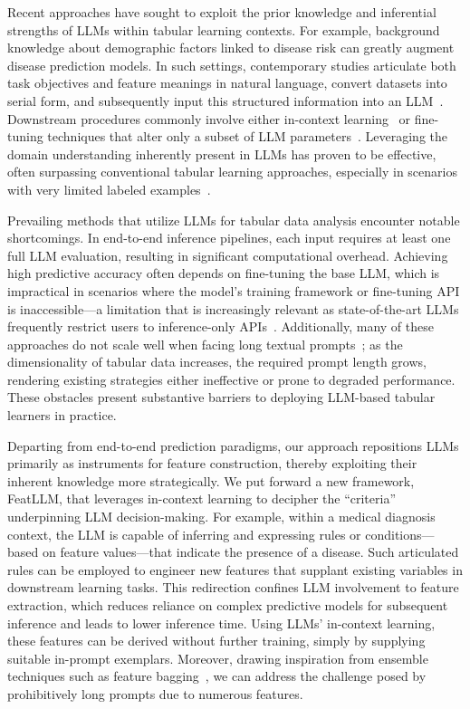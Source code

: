 Recent approaches have sought to exploit the prior knowledge and inferential strengths of LLMs within tabular learning contexts. For example, background knowledge about demographic factors linked to disease risk can greatly augment disease prediction models. In such settings, contemporary studies articulate both task objectives and feature meanings in natural language, convert datasets into serial form, and subsequently input this structured information into an LLM~\cite{dinh2022lift,wang2023anypredict}. Downstream procedures commonly involve either in-context learning~\cite{nam2023semi} or fine-tuning techniques that alter only a subset of LLM parameters~\cite{dinh2022lift,hegselmann2023tabllm}. Leveraging the domain understanding inherently present in LLMs has proven to be effective, often surpassing conventional tabular learning approaches, especially in scenarios with very limited labeled examples~\cite{hegselmann2023tabllm}.

Prevailing methods that utilize LLMs for tabular data analysis encounter notable shortcomings. In end-to-end inference pipelines, each input requires at least one full LLM evaluation, resulting in significant computational overhead. Achieving high predictive accuracy often depends on fine-tuning the base LLM, which is impractical in scenarios where the model's training framework or fine-tuning API is inaccessible—a limitation that is increasingly relevant as state-of-the-art LLMs frequently restrict users to inference-only APIs~\cite{anil2023palm,openai2023gpt4}. Additionally, many of these approaches do not scale well when facing long textual prompts~\cite{liu2023lost}; as the dimensionality of tabular data increases, the required prompt length grows, rendering existing strategies either ineffective or prone to degraded performance. These obstacles present substantive barriers to deploying LLM-based tabular learners in practice.

Departing from end-to-end prediction paradigms, our approach repositions LLMs primarily as instruments for feature construction, thereby exploiting their inherent knowledge more strategically. We put forward a new framework, \textsf{FeatLLM}, that leverages in-context learning to decipher the “criteria” underpinning LLM decision-making. For example, within a medical diagnosis context, the LLM is capable of inferring and expressing rules or conditions—based on feature values—that indicate the presence of a disease. Such articulated rules can be employed to engineer new features that supplant existing variables in downstream learning tasks. This redirection confines LLM involvement to feature extraction, which reduces reliance on complex predictive models for subsequent inference and leads to lower inference time. Using LLMs’ in-context learning, these features can be derived without further training, simply by supplying suitable in-prompt exemplars. Moreover, drawing inspiration from ensemble techniques such as feature bagging~\cite{breiman2001random}, we can address the challenge posed by prohibitively long prompts due to numerous features.

